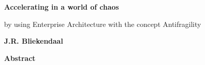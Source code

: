 \thispagestyle{plain}
\begin{center}
	\Large
	\textbf{Accelerating in a world of chaos}
	
	\vspace{0.4cm}
	\large
	by using Enterprise Architecture with the concept Antifragility
	
	\vspace{0.4cm}
	\textbf{J.R. Bliekendaal}
	
	\vspace{0.9cm}
	\textbf{Abstract}
\end{center}

\lipsum[1]